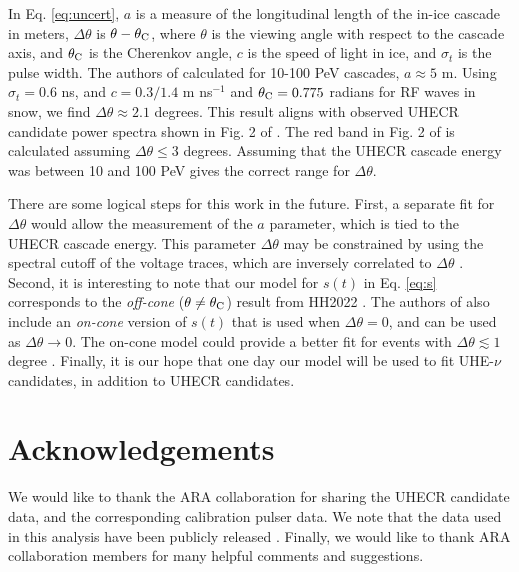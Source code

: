 \documentclass[amsmath,amssymb,aps,prd,10pt,twocolumn,showkeys]{revtex4}
\begin{document}
\noindent
In Eq. \ref{eq:uncert}, $a$ is a measure of the longitudinal length of the in-ice cascade in meters, $\Delta\theta$ is $\theta - \theta_{\rm C}$, where $\theta$ is the viewing angle with respect to the cascade axis, and $\theta_{\rm C}$ is the Cherenkov angle, $c$ is the speed of light in ice, and $\sigma_t$ is the pulse width.  The authors of \cite{PhysRevD.105.123019} calculated for 10-100 PeV cascades, $a \approx 5$ m.  Using $\sigma_t = 0.6$ ns, and $c = 0.3/1.4$ m ns$^{-1}$ and $\theta_{\rm C} = 0.775$ radians for RF waves in snow, we find $\Delta\theta \approx 2.1$ degrees.  This result aligns with observed UHECR candidate power spectra shown in Fig. 2 of \cite{xwqy-yzrk}.  The red band in Fig. 2 of \cite{xwqy-yzrk} is calculated assuming $\Delta\theta \leq 3$ degrees.  Assuming that the UHECR cascade energy was between 10 and 100 PeV gives the correct range for $\Delta\theta$.

There are some logical steps for this work in the future. First, a separate fit for $\Delta\theta$ would allow the measurement of the $a$ parameter, which is tied to the UHECR cascade energy. This parameter $\Delta\theta$ may be constrained by using the spectral cutoff of the voltage traces, which are inversely correlated to $\Delta\theta$ \cite{10.1016/j.astropartphys.2017.03.008}.  Second, it is interesting to note that our model for $s(t)$ in Eq. \ref{eq:s} corresponds to the \textit{off-cone} ($\theta\neq \theta_{\rm C}$) result from HH2022 \cite{PhysRevD.105.123019}.  The authors of \cite{PhysRevD.105.123019} also include an \textit{on-cone} version of $s(t)$ that is used when $\Delta\theta = 0$, and can be used as $\Delta\theta\to 0$.  The on-cone model could provide a better fit for events with $\Delta\theta \lesssim 1$ degree \cite{PhysRevD.105.123019}.  Finally, it is our hope that one day our model will be used to fit UHE-$\nu$ candidates, in addition to UHECR candidates.

\section{Acknowledgements}

We would like to thank the ARA collaboration for sharing the UHECR candidate data, and the corresponding calibration pulser data.  We note that the data used in this analysis have been publicly released \cite{url}.  Finally, we would like to thank ARA collaboration members for many helpful comments and suggestions.


\end{document}
